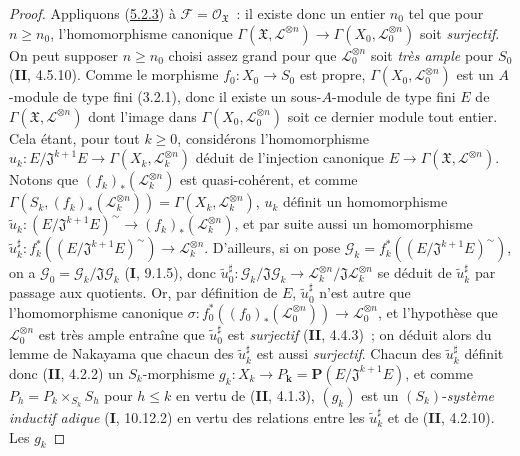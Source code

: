 \begin{proof}
Appliquons (\hyperref[III.5.2.3-fr]{5.2.3}) à
$\mathcal F=\mathcal O_{\mathfrak X}$~: il existe donc un entier $n_0$ tel que
pour $n\geq n_0$, l'homomorphisme canonique
$\Gamma(\mathfrak X,\mathcal L^{\otimes n})\to
\Gamma(X_0,\mathcal L_0^{\otimes n})$ soit \emph{surjectif}. On peut supposer
$n\geq n_0$ choisi assez grand pour que $\mathcal L_0^{\otimes n}$ soit \emph{très
ample} pour $S_0$ (\textbf{II}, 4.5.10). Comme le morphisme $f_0:X_0\to S_0$ est propre,
$\Gamma(X_0,\mathcal L_0^{\otimes n})$ est un $A$-module de type fini (3.2.1),
donc il existe un sous-$A$-module de type fini $E$ de
$\Gamma(\mathfrak X,\mathcal L^{\otimes n})$ dont l'image dans
$\Gamma(X_0,\mathcal L_0^{\otimes n})$ soit ce dernier module tout entier.
Cela étant, pour tout $k\geq0$, considérons l'homomorphisme
$u_k:E/\mathfrak J^{k+1}E\longrightarrow
\Gamma(X_k,\mathcal L_k^{\otimes n})$
déduit de l'injection canonique
$E\to\Gamma(\mathfrak X,\mathcal L^{\otimes n})$. Notons que
$(f_k)_*(\mathcal L_k^{\otimes n})$ est quasi-cohérent, et comme
$\Gamma(S_k,(f_k)_*(\mathcal L_k^{\otimes n}))
=\Gamma(X_k,\mathcal L_k^{\otimes n})$, $u_k$ définit un homomorphisme
$\widetilde u_k:(E/\mathfrak J^{k+1}E)^\sim
\longrightarrow(f_k)_*(\mathcal L_k^{\otimes n})$,
et par suite aussi un homomorphisme
$\widetilde u_k^\sharp:
f_k^*((E/\mathfrak J^{k+1}E)^\sim)\longrightarrow
\mathcal L_k^{\otimes n}$.
D'ailleurs, si on pose
$\mathcal G_k=f_k^*((E/\mathfrak J^{k+1}E)^\sim)$, on a
$\mathcal G_0=\mathcal G_k/\mathfrak J\mathcal G_k$ (\textbf{I}, 9.1.5), donc
$\widetilde u_0^\sharp:\mathcal G_k/\mathfrak J\mathcal G_k
\to\mathcal L_k^{\otimes n}/\mathfrak J\mathcal L_k^{\otimes n}$ se déduit
de $\widetilde u_k^\sharp$ par passage aux quotients. Or, par définition de
$E$, $\widetilde u_0^\sharp$ n'est autre que l'homomorphisme canonique
$\sigma:f_0^*((f_0)_*(\mathcal L_0^{\otimes n}))\longrightarrow
\mathcal L_0^{\otimes n}$,
et l'hypothèse que $\mathcal L_0^{\otimes n}$ est très ample entraîne que
$\widetilde u_0^\sharp$ est \emph{surjectif} (\textbf{II}, 4.4.3)~; on déduit alors du lemme
de Nakayama que chacun des $\widetilde u_k^\sharp$ est aussi \emph{surjectif}.
Chacun des $\widetilde u_k^\sharp$ définit donc (\textbf{II}, 4.2.2) un
$S_k$-morphisme
$g_k:X_k\longrightarrow P_{\boldsymbol{k}}=\mathbf P(E/\mathfrak J^{k+1}E)$,
et comme $P_h=P_k\times_{S_k}S_h$ pour $h\leq k$ en vertu de (\textbf{II}, 4.1.3),
$(g_k)$ est un $(S_k)$-\emph{système inductif adique} (\textbf{I}, 10.12.2) en vertu des
relations entre les $\widetilde u_k^\sharp$ et de (\textbf{II}, 4.2.10). Les $g_k$

\end{proof}
